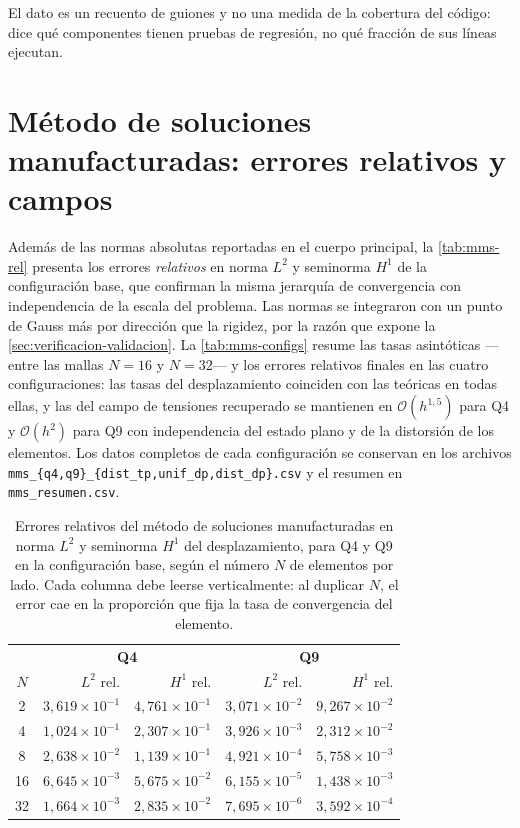 El dato es un recuento de guiones y no una medida de la cobertura del código: dice qué componentes tienen pruebas de regresión, no qué fracción de sus líneas ejecutan.

\section{Método de soluciones manufacturadas: errores relativos y campos}

Además de las normas absolutas reportadas en el cuerpo principal, la \autoref{tab:mms-rel} presenta los errores \emph{relativos} en norma $L^2$ y seminorma $H^1$ de la configuración base, que confirman la misma jerarquía de convergencia con independencia de la escala del problema. Las normas se integraron con un punto de Gauss más por dirección que la rigidez, por la razón que expone la \autoref{sec:verificacion-validacion}. La \autoref{tab:mms-configs} resume las tasas asintóticas ---entre las mallas $N=16$ y $N=32$--- y los errores relativos finales en las cuatro configuraciones: las tasas del desplazamiento coinciden con las teóricas en todas ellas, y las del campo de tensiones recuperado se mantienen en $\mathcal{O}(h^{1{,}5})$ para Q4 y $\mathcal{O}(h^{2})$ para Q9 con independencia del estado plano y de la distorsión de los elementos. Los datos completos de cada configuración se conservan en los archivos \texttt{mms\_\{q4,q9\}\_\{dist\_tp,unif\_dp,dist\_dp\}.csv} y el resumen en \texttt{mms\_resumen.csv}.

\begin{table}[htbp]
\centering
\caption[Errores relativos del MMS en norma $L^2$ y seminorma $H^1$ del desplazamiento.]{Errores relativos del método de soluciones manufacturadas en norma $L^2$ y seminorma $H^1$ del desplazamiento, para Q4 y Q9 en la configuración base, según el número $N$ de elementos por lado. Cada columna debe leerse verticalmente: al duplicar $N$, el error cae en la proporción que fija la tasa de convergencia del elemento.}
\label{tab:mms-rel}
\begin{tabular}{c r r r r}
\hline
 & \multicolumn{2}{c}{\textbf{Q4}} & \multicolumn{2}{c}{\textbf{Q9}} \\
$N$ & $L^2$ rel. & $H^1$ rel. & $L^2$ rel. & $H^1$ rel. \\
\hline
2  & $3{,}619\times10^{-1}$ & $4{,}761\times10^{-1}$ & $3{,}071\times10^{-2}$ & $9{,}267\times10^{-2}$ \\
4  & $1{,}024\times10^{-1}$ & $2{,}307\times10^{-1}$ & $3{,}926\times10^{-3}$ & $2{,}312\times10^{-2}$ \\
8  & $2{,}638\times10^{-2}$ & $1{,}139\times10^{-1}$ & $4{,}921\times10^{-4}$ & $5{,}758\times10^{-3}$ \\
16 & $6{,}645\times10^{-3}$ & $5{,}675\times10^{-2}$ & $6{,}155\times10^{-5}$ & $1{,}438\times10^{-3}$ \\
32 & $1{,}664\times10^{-3}$ & $2{,}835\times10^{-2}$ & $7{,}695\times10^{-6}$ & $3{,}592\times10^{-4}$ \\
\hline
\end{tabular}
\end{table}

